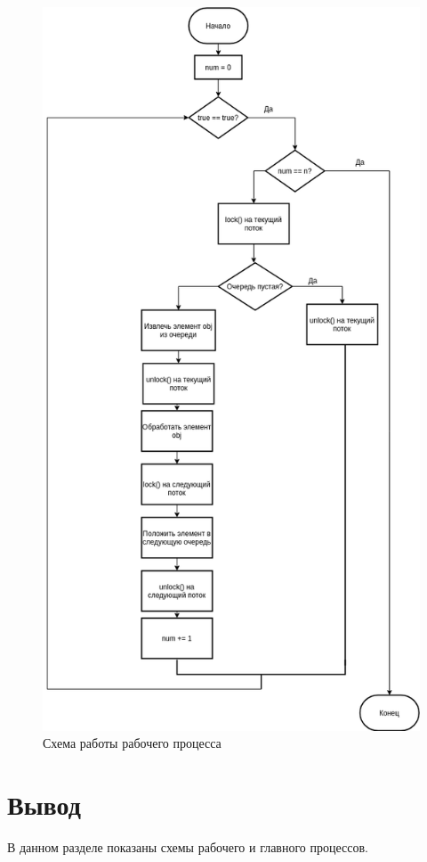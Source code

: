 \documentclass[12pt]{report}
\begin{document}
\begin{figure}[h]
	\centering
	\includegraphics[scale=0.4]{proc.png}
	\caption{Схема работы рабочего процесса}
	\label{fig:proc}
\end{figure}

\section{Вывод}
	В данном разделе показаны схемы рабочего и главного процессов.
\end{document}

